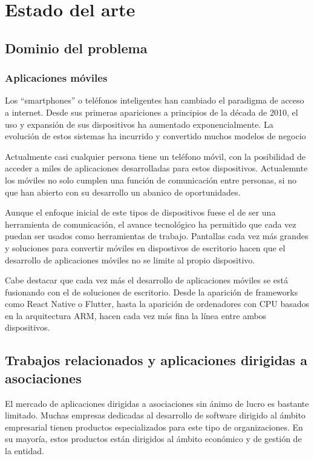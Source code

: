 \chapter{Estado del arte}

\section{Dominio del problema}

\subsection{Aplicaciones móviles}

Los ``smartphones'' o teléfonos inteligentes han cambiado el paradigma de acceso a internet. Desde sus primeras apariciones a principios de la década de 2010, el uso y expansión de sus dispositivos ha aumentado exponencialmente. La evolución de estos sistemas ha incurrido y convertido muchos modelos de negocio

Actualmente casi cualquier persona tiene un teléfono móvil, con la posibilidad de acceder a miles de aplicaciones desarrolladas para estos dispositivos. Actualemnte los móviles no solo cumplen una función de comunicación entre personas, si no que han abierto con su desarrollo un abanico de oportunidades.

Aunque el enfoque inicial de este tipos de dispositivos fuese el de ser una herramienta de comunicación, el avance tecnológico ha permitido que cada vez puedan ser usados como herramientas de trabajo. Pantallas cada vez más grandes y soluciones para convertir móviles en dispostivos de escritorio hacen que el desarrollo de aplicaciones móviles no se limite al propio dispositivo. 

Cabe destacar que cada vez más el desarrollo de aplicaciones móviles se está fusionando con el de soluciones de escritorio. Desde la aparición de frameworks como React Native o Flutter, hasta la aparición de ordenadores con CPU basados en la arquitectura ARM, hacen cada vez más fina la línea entre ambos dispositivos. 

\section{Trabajos relacionados y aplicaciones dirigidas a asociaciones}

El mercado de aplicaciones dirigidas a asociaciones sin ánimo de lucro es bastante limitado. Muchas empresas dedicadas al desarrollo de software dirigido al ámbito empresarial tienen productos especializados para este tipo de organizaciones. En su mayoría, estos productos están dirigidos al ámbito económico y de gestión de la entidad. 

